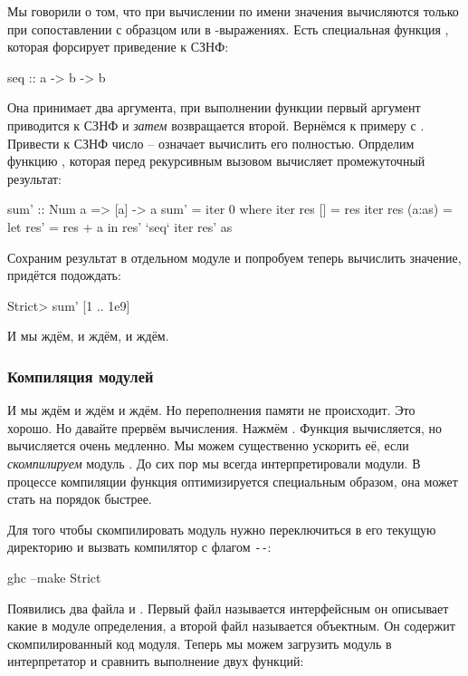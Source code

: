 Мы говорили о том, что при вычислении по имени значения вычисляются 
только при сопоставлении с образцом или в -выражениях. 
Есть специальная функция , которая форсирует приведение к СЗНФ:

\begin{code}
seq :: a -> b -> b
\end{code}

Она принимает два аргумента, при выполнении функции первый
аргумент приводится к СЗНФ и \emph{затем} возвращается второй.
Вернёмся к примеру с . Привести к СЗНФ число -- означает
вычислить его полностью. Опрделим функцию , которая 
перед рекурсивным вызовом вычисляет промежуточный результат:

\begin{code}
sum' :: Num a => [a] -> a
sum' = iter 0 
    where iter res []        = res
          iter res (a:as)    = let res' = res + a
                               in  res' `seq` iter res' as 
\end{code}

Сохраним результат в отдельном модуле  и
попробуем теперь вычислить значение, придётся подождать:

\begin{code}
Strict> sum' [1 .. 1e9]
\end{code}

И мы ждём, и ждём, и ждём.


\subsubsection{Компиляция модулей}

И мы ждём и ждём и ждём. Но переполнения памяти не происходит.
Это хорошо. Но давайте прервём вычисления. Нажмём .
Функция  вычисляется, но вычисляется очень медленно.
Мы можем существенно ускорить её, если \emph{скомпилируем}
модуль . До сих пор мы всегда интерпретировали модули. 
В процессе компиляции функция оптимизируется специальным
образом, она может стать на порядок быстрее. 

Для того чтобы скомпилировать модуль нужно переключиться
в его текущую директорию и вызвать компилятор  с
флагом  \verb!--!:

\begin{code}
ghc --make Strict
\end{code}

Появились два файла  и . Первый
файл называется интерфейсным он описывает какие в модуле 
определения, а второй файл называется объектным. Он содержит
скомпилированный код модуля. Теперь мы можем загрузить 
модуль  в интерпретатор и сравнить выполнение двух функций:



